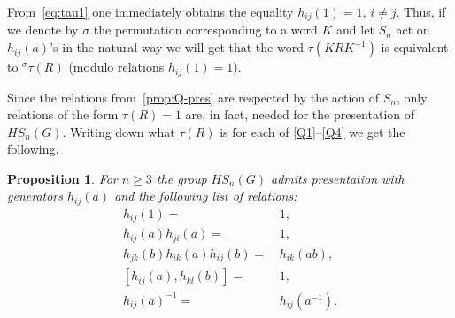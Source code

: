 \documentclass[oneside, 12pt]{amsart}
\theoremstyle{plain}
\numberwithin{equation}{section}
\numberwithin{lemma}{section}
\newtheorem{prop}[lemma]{Proposition}
\theoremstyle{remark}
\theoremstyle{definition}
\begin{document}
From~\eqref{eq:tau1} one immediately obtains the equality $h_{ij}(1)=1$, $i\neq j$.
Thus, if we denote by $\sigma$ the permutation corresponding to a word $K$ and let $S_n$ act on $h_{ij}(a)$'s in the natural way
 we will get that the word $\tau(KRK^{-1})$ is equivalent to ${}^{\sigma}\tau(R)$ (modulo relations $h_{ij}(1)=1$). 

Since the relations from~\cref{prop:Q-pres} are respected by the action of $S_n$,
 only relations of the form $\tau(R)=1$ are, in fact, needed for the presentation of $HS_n(G)$.
Writing down what $\tau(R)$ is for each of \eqref{Q1}--\eqref{Q4} we get the following.
 
\begin{prop} \label{prop:HSpres} For $n\geq 3$ the group $HS_n(G)$ admits presentation with generators $h_{ij}(a)$ and the following list of relations:
\begin{align}
h_{ij}(1)                     = &\, 1,              \tag{R0} \label{H0} \\
h_{ij}(a) h_{ji}(a)           = &\, 1,              \tag{R1} \label{H1} \\
h_{jk}(b) h_{ik}(a) h_{ij}(b) = &\, h_{ik}(ab),     \tag{R2} \label{H2} \\
[h_{ij}(a), h_{kl}(b)]        = &\, 1,              \tag{R3} \label{H3} \\
h_{ij}(a)^{-1}                = &\, h_{ij}(a^{-1}). \tag{R4} \label{H4}
\end{align}
\end{prop}
\end{document}

